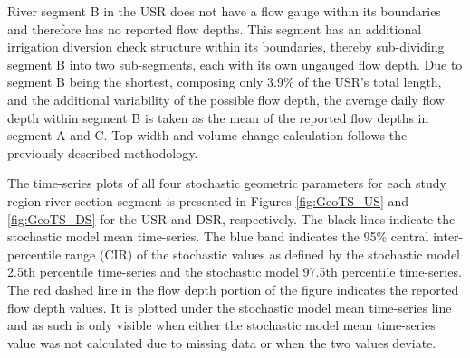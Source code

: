 River segment B in the USR does not have a flow gauge within its boundaries and therefore has no reported flow depths. This segment has an additional irrigation diversion check structure within its boundaries, thereby sub-dividing segment B into two sub-segments, each with its own ungauged flow depth.  Due to segment B being the shortest, composing only 3.9\% of the USR's total length, and the additional variability of the possible flow depth, the average daily flow depth within segment B is taken as the mean of the reported flow depths in segment A and C.  Top width and volume change calculation follows the previously described methodology.

\clearpage
The time-series plots of all four stochastic geometric parameters for each study region river section segment is presented in Figures \ref{fig:GeoTS_US} and \ref{fig:GeoTS_DS} for the USR and DSR, respectively.  The black lines indicate the stochastic model mean time-series.  The blue band indicates the 95\% central inter-percentile range (CIR) of the stochastic values as defined by the stochastic model 2.5th percentile time-series and the stochastic model 97.5th percentile time-series.  The red dashed line in the flow depth portion of the figure indicates the reported flow depth values.  It is plotted under the stochastic model mean time-series line and as such is only visible when either the stochastic model mean time-series value was not calculated due to missing data or when the two values deviate.

